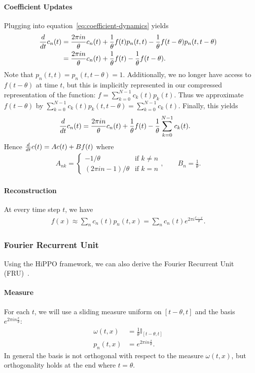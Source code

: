 \documentclass[../../hippo]{subfiles}
\begin{document}
\paragraph{Coefficient Updates}
Plugging into equation~\eqref{eq:coefficient-dynamics} yields
\begin{align*}
  \frac{d}{d t} c_n(t)
  &= \frac{2\pi in}{\theta} c_n(t) + \frac{1}{\theta} f(t) p_n(t, t) - \frac{1}{\theta} f(t-\theta) p_n(t, t-\theta) \\
  &= \frac{2\pi in}{\theta} c_n(t) + \frac{1}{\theta} f(t) - \frac{1}{\theta} f(t-\theta).
\end{align*}
Note that $p_n(t, t) = p_n(t, t-\theta) = 1$.
Additionally, we no longer have access to $f(t-\theta)$ at time $t$, but this is
implicitly represented in our compressed representation of the function:
$f = \sum_{k=0}^{N-1} c_k(t) p_k(t)$.
Thus we approximate $f(t-\theta)$ by $\sum_{k=0}^{N-1} c_k(t) p_k(t, t-\theta) = \sum_{k=0}^{N-1} c_k(t)$.
Finally, this yields
\begin{align*}
  \frac{d}{d t} c_n(t) &= \frac{2\pi in}{\theta} c_n(t) + \frac{1}{\theta} f(t) - \frac{1}{\theta} \sum_{k=0}^{N-1} c_k(t).
\end{align*}
Hence $\frac{d}{d t} c(t) = A c(t) + B f(t)$
where
\begin{align*}
  A_{nk} =
  \begin{cases}
    -1/\theta & \mbox{if } k \neq n \\
    (2\pi in-1)/\theta & \mbox{if } k = n
  \end{cases},
  \qquad
  B_n = \frac{1}{\theta}.
\end{align*}

\paragraph{Reconstruction}

At every time step $t$, we have
\begin{align*}
  f(x) \approx \sum_n c_n(t) p_n(t, x) = \sum_{n} c_n(t) e^{2\pi i \frac{t - x}{\theta}}.
\end{align*}

\subsubsection{Fourier Recurrent Unit}

Using the HiPPO framework, we can also derive the Fourier Recurrent Unit (FRU)~\citep{zhang2018learning}.
\paragraph{Measure}
For each $t$, we will use a sliding measure uniform on $[t - \theta, t]$ and the
basis $e^{2\pi i n \frac{x}{\theta}}$:
\begin{align*}
  \omega(t, x) &= \frac{1}{\theta} \mathbb{I}_{[t-\theta, t]}
  \\
  p_n(t, x) &= e^{2\pi in \frac{x}{\theta}}.
\end{align*}
In general the basis is not orthogonal with respect to the measure $\omega(t, x)$, but
orthogonality holds at the end where $t = \theta$.
\end{document}
